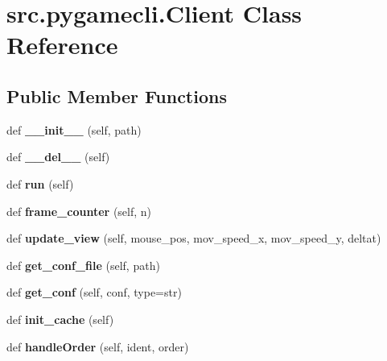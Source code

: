 \hypertarget{classsrc_1_1pygamecli_1_1_client}{}\section{src.\+pygamecli.\+Client Class Reference}
\label{classsrc_1_1pygamecli_1_1_client}
\subsection*{Public Member Functions}
\begin{DoxyCompactItemize}
\item 
\hypertarget{classsrc_1_1pygamecli_1_1_client_a026773e6fff92ccb800a1cbe4342829b}{}\label{classsrc_1_1pygamecli_1_1_client_a026773e6fff92ccb800a1cbe4342829b} 
def {\bfseries \+\_\+\+\_\+init\+\_\+\+\_\+} (self, path)
\item 
\hypertarget{classsrc_1_1pygamecli_1_1_client_ac92efdae0937a1aab92800264b8ae9d5}{}\label{classsrc_1_1pygamecli_1_1_client_ac92efdae0937a1aab92800264b8ae9d5} 
def {\bfseries \+\_\+\+\_\+del\+\_\+\+\_\+} (self)
\item 
\hypertarget{classsrc_1_1pygamecli_1_1_client_a7b40cbfdb9c8ef4b3ad0bf77d38ded51}{}\label{classsrc_1_1pygamecli_1_1_client_a7b40cbfdb9c8ef4b3ad0bf77d38ded51} 
def {\bfseries run} (self)
\item 
\hypertarget{classsrc_1_1pygamecli_1_1_client_aed63a1cc434cba703729fbc1644b2e96}{}\label{classsrc_1_1pygamecli_1_1_client_aed63a1cc434cba703729fbc1644b2e96} 
def {\bfseries frame\+\_\+counter} (self, n)
\item 
\hypertarget{classsrc_1_1pygamecli_1_1_client_abdf36b75f4b29e4f2c74d3a6b5144e10}{}\label{classsrc_1_1pygamecli_1_1_client_abdf36b75f4b29e4f2c74d3a6b5144e10} 
def {\bfseries update\+\_\+view} (self, mouse\+\_\+pos, mov\+\_\+speed\+\_\+x, mov\+\_\+speed\+\_\+y, deltat)
\item 
\hypertarget{classsrc_1_1pygamecli_1_1_client_a83d8335f554e9bf57faba2e4ef53e6e9}{}\label{classsrc_1_1pygamecli_1_1_client_a83d8335f554e9bf57faba2e4ef53e6e9} 
def {\bfseries get\+\_\+conf\+\_\+file} (self, path)
\item 
\hypertarget{classsrc_1_1pygamecli_1_1_client_a50c4ff7e216329722138db8fbd37f198}{}\label{classsrc_1_1pygamecli_1_1_client_a50c4ff7e216329722138db8fbd37f198} 
def {\bfseries get\+\_\+conf} (self, conf, type=str)
\item 
\hypertarget{classsrc_1_1pygamecli_1_1_client_a98b0b9df5770463e16b247562d3f15bf}{}\label{classsrc_1_1pygamecli_1_1_client_a98b0b9df5770463e16b247562d3f15bf} 
def {\bfseries init\+\_\+cache} (self)
\item 
\hypertarget{classsrc_1_1pygamecli_1_1_client_a6916abb43b5c9bedeacaaa854f80a9d5}{}\label{classsrc_1_1pygamecli_1_1_client_a6916abb43b5c9bedeacaaa854f80a9d5} 
def {\bfseries handle\+Order} (self, ident, order)
\end{DoxyCompactItemize}
